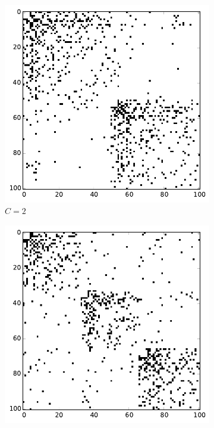 \begin{figure}[h]
        \centering
        \begin{subfigure}[b]{0.3\textwidth}
        	\centering
                \includegraphics[width=\textwidth]{images/topology/hierarchical_adjacency_2_dot25.pdf}
                \caption{$C=2$}
        \end{subfigure}
        \begin{subfigure}[b]{0.3\textwidth}
        	\centering
                \includegraphics[width=\textwidth]{images/topology/hierarchical_adjacency_3_dot25.pdf}

\end{subfigure}
\end{figure}
